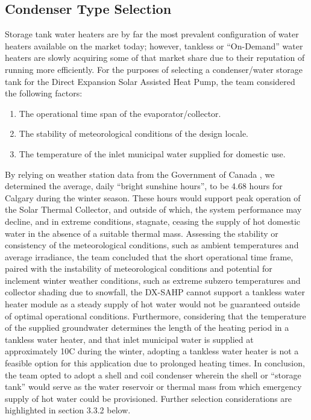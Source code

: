 \subsection{Condenser Type Selection}

Storage tank water heaters are by far the most prevalent configuration of water heaters available on the market today; however, tankless or “On-Demand” water heaters are slowly acquiring some of that market share due to their reputation of running more efficiently. For the purposes of selecting a condenser/water storage tank for the Direct Expansion Solar Assisted Heat Pump, the team considered the following factors:

\medskip
\begin{enumerate}[itemsep=3mm, parsep=-1mm, label=\roman*.]
    \item The operational time span of the evaporator/collector.
    \item The stability of meteorological conditions of the design locale.
    \item The temperature of the inlet municipal water supplied for domestic use.
\end{enumerate}

\medskip
By relying on weather station data from the Government of Canada \cite{climate_summary}, we determined the average, daily “bright sunshine hours”, to be 4.68 hours for Calgary during the winter season. These hours would support peak operation of the Solar Thermal Collector, and outside of which, the system performance may decline, and in extreme conditions, stagnate, ceasing the supply of hot domestic water in the absence of a suitable thermal mass. Assessing the stability or consistency of the meteorological conditions, such as ambient temperatures and average irradiance, the team concluded that the short operational time frame, paired with the instability of meteorological conditions and potential for inclement winter weather conditions, such as extreme subzero temperatures and collector shading due to snowfall, the DX-SAHP cannot support a tankless water heater module as a steady supply of hot water would not be guaranteed outside of optimal operational conditions. Furthermore, considering that the temperature of the supplied groundwater determines the length of the heating period in a tankless water heater, and that inlet municipal water is supplied at approximately 10\textdegree C during the winter, adopting a tankless water heater is not a feasible option for this application due to prolonged heating times. In conclusion, the team opted to adopt a shell and coil condenser wherein the shell or “storage tank” would serve as the water reservoir or thermal mass from which emergency supply of hot water could be provisioned. Further selection considerations are highlighted in section 3.3.2 below.

